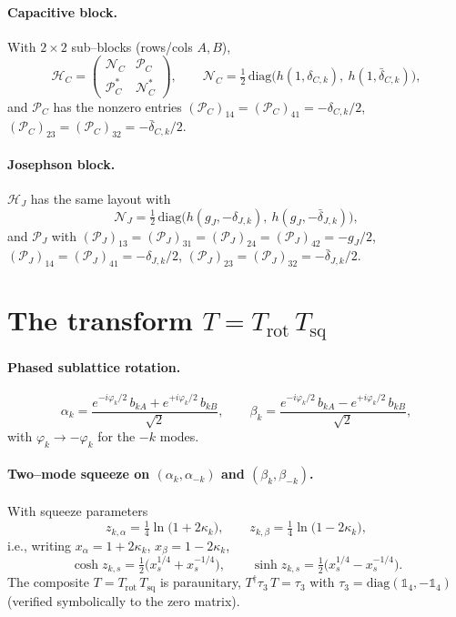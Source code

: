 \documentclass[11pt]{article}
\newcommand{\dC}{\delta_{C,k}}
\newcommand{\dJ}{\delta_{J,k}}
\newcommand{\dCb}{\bar\delta_{C,k}}
\newcommand{\dJb}{\bar\delta_{J,k}}
\newcommand{\kk}{\kappa_k}
\newcommand{\ph}{\varphi_k}
\newcommand{\gJ}{g_J}
\newcommand{\Tr}{T_{\mathrm{rot}}}
\newcommand{\Tsq}{T_{\mathrm{sq}}}
\begin{document}
\paragraph{Capacitive block.}
With $2\times2$ sub--blocks (rows/cols $A,B$),
\[
  \mathcal H_C=
  \begin{pmatrix} \mathcal N_C & \mathcal P_C\\[2pt] \mathcal P_C^{*} & \mathcal N_C^{*}\end{pmatrix},
  \qquad
  \mathcal N_C=\tfrac12\,\mathrm{diag}\bigl(h(1,\dC),\ h(1,\dCb)\bigr),
\]
and $\mathcal P_C$ has the nonzero entries
$(\mathcal P_C)_{14}=(\mathcal P_C)_{41}=-\dC/2$,
$(\mathcal P_C)_{23}=(\mathcal P_C)_{32}=-\dCb/2$.

\paragraph{Josephson block.}
$\mathcal H_J$ has the same layout with
\[
  \mathcal N_J=\tfrac12\,\mathrm{diag}\bigl(h(\gJ,-\dJ),\ h(\gJ,-\dJb)\bigr),
\]
and $\mathcal P_J$ with
$(\mathcal P_J)_{13}=(\mathcal P_J)_{31}=(\mathcal P_J)_{24}=(\mathcal P_J)_{42}=-\gJ/2$,
$(\mathcal P_J)_{14}=(\mathcal P_J)_{41}=-\dJ/2$,
$(\mathcal P_J)_{23}=(\mathcal P_J)_{32}=-\dJb/2$.

\section{The transform \texorpdfstring{$T=\Tr\,\Tsq$}{T = Trot Tsq}}\label{sec:T}

\paragraph{Phased sublattice rotation.}
\begin{equation}
  \alpha_k=\frac{e^{-i\ph/2}\,b_{kA}+e^{+i\ph/2}\,b_{kB}}{\sqrt2},
  \qquad
  \beta_k=\frac{e^{-i\ph/2}\,b_{kA}-e^{+i\ph/2}\,b_{kB}}{\sqrt2},
\end{equation}
with $\ph\to-\ph$ for the $-k$ modes.

\paragraph{Two--mode squeeze on $(\alpha_k,\alpha_{-k})$ and $(\beta_k,\beta_{-k})$.}
With squeeze parameters
\begin{equation}
  z_{k,\alpha}=\tfrac14\ln\!\bigl(1+2\kk\bigr),
  \qquad
  z_{k,\beta}=\tfrac14\ln\!\bigl(1-2\kk\bigr),
\end{equation}
i.e., writing $x_\alpha=1+2\kk$, $x_\beta=1-2\kk$,
\[
  \cosh z_{k,s}=\tfrac12\bigl(x_s^{1/4}+x_s^{-1/4}\bigr),
  \qquad
  \sinh z_{k,s}=\tfrac12\bigl(x_s^{1/4}-x_s^{-1/4}\bigr).
\]
The composite $T=\Tr\,\Tsq$ is paraunitary,
$T^{\dagger}\tau_3\,T=\tau_3$ with $\tau_3=\mathrm{diag}(\mathbb 1_4,-\mathbb 1_4)$
(verified symbolically to the zero matrix).
\end{document}
